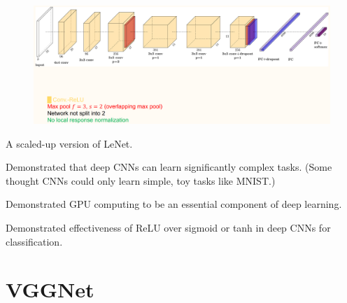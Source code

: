 \documentclass{report}
\begin{document}
\begin{definition}
    \begin{figure}[H]
        \centering
        \includegraphics[width=1.0\textwidth]{.././assets/7.6.png}
    \end{figure}
\end{definition}

\begin{concept}
    A scaled-up version of LeNet.

    Demonstrated that deep CNNs can learn significantly complex tasks. (Some thought CNNs could only learn simple, toy tasks like MNIST.)

    Demonstrated GPU computing to be an essential component of deep learning.

    Demonstrated effectiveness of ReLU over sigmoid or tanh in deep CNNs for classification.
\end{concept}

\section{VGGNet}
\end{document}
